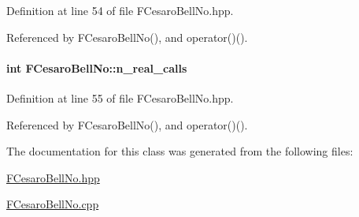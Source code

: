 \-Definition at line 54 of file \-F\-Cesaro\-Bell\-No.\-hpp.



\-Referenced by \-F\-Cesaro\-Bell\-No(), and operator()().

\hypertarget{classFCesaroBellNo_a933042ae08451f7e7c102787d3eb6211}{
\paragraph[{n\-\_\-real\-\_\-calls}]{\setlength{\rightskip}{0pt plus 5cm}int {\bf \-F\-Cesaro\-Bell\-No\-::n\-\_\-real\-\_\-calls}}}\label{classFCesaroBellNo_a933042ae08451f7e7c102787d3eb6211}


\-Definition at line 55 of file \-F\-Cesaro\-Bell\-No.\-hpp.



\-Referenced by \-F\-Cesaro\-Bell\-No(), and operator()().



\-The documentation for this class was generated from the following files\-:\begin{DoxyCompactItemize}
\item 
\hyperlink{FCesaroBellNo_8hpp}{\-F\-Cesaro\-Bell\-No.\-hpp}\item 
\hyperlink{FCesaroBellNo_8cpp}{\-F\-Cesaro\-Bell\-No.\-cpp}\end{DoxyCompactItemize}
